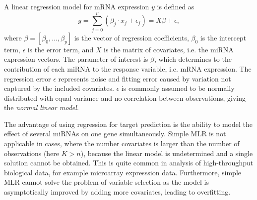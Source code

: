 A linear regression model for mRNA expression $y$ is defined as
\begin{equation}
  \label{eq:linear-regression}
	y = \sum_{j=0}^{p} (\beta_j \cdot x_j + \epsilon_{j}) =  X \beta + \epsilon,
\end{equation}
where $\beta = [\beta_0, \ldots, \beta_p]$ is the vector of regression coefficients,
$\beta_0$ is the intercept term, $\epsilon$ is the error term, and $X$ is the
matrix of covariates, i.e. the miRNA expression vectors. The parameter of
interest is $\beta$, which determines to the contribution of each miRNA to the
response variable, i.e. mRNA expression. The regression error $\epsilon$
represents noise and fitting error caused by variation not captured by the
included covariates. $\epsilon$ is commonly assumed to be normally
distributed with equal variance and no correlation between observations,
giving the \emph{normal linear model}.

The advantage of using regression for target prediction is the ability to
model the effect of several miRNAs on one gene simultaneously.
Simple MLR is not applicable in cases, where the number covariates is larger
than the number of observations (here $K > n$), because the linear model is
undetermined and a single solution cannot be obtained. This is quite common
in analysis of high-throughput biological data, for example microarray
expresssion data. Furthermore, simple MLR cannot solve the problem of
variable selection as the model is asymptotically
improved by adding more covariates, leading to overfitting.

